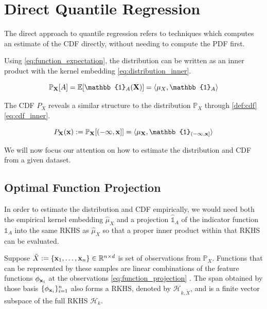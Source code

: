 \documentclass[twoside]{article} \usepackage{aistats2017}
\theoremstyle{definition}
\theoremstyle{theorem}
\newcommand{\rv}[1]{{#1}}
\newcommand{\ds}[1]{\tilde{#1}}
\begin{document}
\section{Direct Quantile Regression}
\label{sec:direct_quantile_regression}

	The direct approach to quantile regression refers to techniques which computes an estimate of the CDF directly, without needing to compute the PDF first.
	
	Using \eqref{eq:function_expectation}, the distribution can be written as an inner product with the kernel embedding \eqref{eq:distribution_inner}.
		
	\begin{equation}
		\mathbb{P}_{\bvec{\rv{X}}}[A] = \mathbb{E}[\mathbb{1}_{A}(\bvec{\rv{X}})] = \langle \mu_{\rv{X}}, \mathbb{1}_{A} \rangle
	\label{eq:distribution_inner}
	\end{equation}

	The CDF  $P_{\rv{X}}$ reveals a similar structure to the distribution $\mathbb{P}_{\rv{X}}$ through \cref{def:cdf} \eqref{eq:cdf_inner}.
			
	\begin{equation}
		P_{\bvec{\rv{X}}}(\bvec{x}) := \mathbb{P}_{\bvec{\rv{X}}}[(-\bvec{\infty}, \bvec{x}]] = \langle \mu_{\bvec{\rv{X}}}, \mathbb{1}_{(-\bvec{\infty}, \bvec{x}]} \rangle
	\label{eq:cdf_inner}
	\end{equation}

	We will now focus our attention on how to estimate the distribution and CDF from a given dataset.
	
	\subsection{Optimal Function Projection}
	\label{sec:direct_quantile_regression:optimal_function_approximation}
	
		In order to estimate the distribution and CDF empirically, we would need both the empirical kernel embedding $\hat{\mu}_{\rv{X}}$ and a projection $\hat{\mathbb{1}}_{A}$ of the indicator function $\mathbb{1}_{A}$ into the same RKHS as $\hat{\mu}_{\rv{X}}$ so that a proper inner product within that RKHS can be evaluated.

		Suppose $\ds{X} := \{\bvec{x}_{1}, \dots, \bvec{x}_{n}\} \in \mathbb{R}^{n \times d}$ is set of observations from $\mathbb{P}_{\rv{X}}$. Functions that can be represented by these samples are linear combinations of the feature functions $\phi_{\mathbf{x}_{i}}$ at the observations \eqref{eq:function_projection} \citep{muandet2016kernel}. The span obtained by those basis $\{\phi_{\mathbf{x}_{i}}\}_{i = 1}^{n}$ also forms a RKHS, denoted by $\mathcal{H}_{k, \ds{X}}$, and is a finite vector subspace of the full RKHS $\mathcal{H}_{k}$.
		
\end{document}

